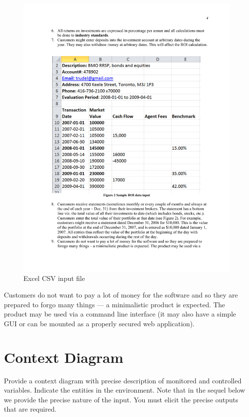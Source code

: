 \documentclass[runningheads,12pt]{article}
\begin{document}
\begin{figure}
\centering
\includegraphics[scale=0.6]{inputs/excel-csv.pdf}

\caption{Excel CSV input file}
\label{fig:csv}
\end{figure}

Customers do not want to pay a lot of money for the software and so they are prepared to forgo many things --- a minimalistic product is expected. The product may be used via a command line interface (it may also have a simple GUI or can be mounted as a properly secured web application). 


\section{Context Diagram}

{\color{red} Provide a context diagram with precise description of monitored and controlled variables. Indicate the entities in the environment. Note that in the sequel below we provide the precise nature of the input. You must elicit the precise outputs that are required.}
\end{document}
